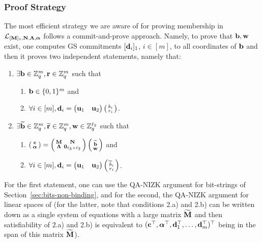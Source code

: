 \subsubsection{Proof Strategy} The most efficient strategy we are aware of for proving membership in $\mathcal{L}_{[\mathbf{{M}}]_1,\mathbf{{N}},\mathbf{{\Lambda}},{\boldsymbol \alpha}}$ follows a 
 commit-and-prove approach. Namely, to prove that $\mathbf{b},\mathbf{w}$ exist, one computes 
GS commitments $[\mathbf{d}_i]_1$, $i \in [m]$, to all coordinates of $\mathbf{b}$ and then it proves two independent statements, namely that:
\vspace{-0.2cm}
\begin{enumerate}
\item $\exists \mathbf{b}\in \mathbb{Z}_q^{m}, \mathbf{r} \in \mathbb{Z}_q^m$ such that  
    \begin{enumerate}
    \item $ \mathbf{b}\in \{0,1\}^{m}$ and 
    \item $\forall i \in [{m}], \mathbf{d}_i=\begin{pmatrix} \mathbf{u}_1 &   \mathbf{u}_2 \end{pmatrix}   \left(\begin{smallmatrix}b_i  \\ r_i\end{smallmatrix}\right)$.
    \end{enumerate}
\item   $\exists \widetilde{\mathbf{b}} \in \mathbb{Z}_q^{m},  \widetilde{\mathbf{r}} \in \mathbb{Z}_q^m, \mathbf{w} \in\mathbb{Z}_q^{\ell_2}$ such that
    \begin{enumerate}
    \item $\left(\begin{smallmatrix}
    \mathbf{c}\\
    {\boldsymbol \alpha}
\end{smallmatrix}\right)
=
\left(\begin{smallmatrix}
    \mathbf{{M}}       & \mathbf{{N}}\\
    \mathbf{{\Lambda}} & \mathbf{{0}}_{{\ell_3}\times {\ell_2}}
\end{smallmatrix}\right)
\left(\begin{smallmatrix}
    \widetilde{\mathbf{b}}\\
    \mathbf{w}
\end{smallmatrix}\right)$ and 
    \item $\forall i \in [m], \mathbf{d}_i=\begin{pmatrix} \mathbf{u}_1 &   \mathbf{u}_2 \end{pmatrix}   \left(\begin{smallmatrix}
\widetilde{b}_i  \\ r_i\end{smallmatrix}\right)$.
    \end{enumerate}
\end{enumerate}
For the first statement, one can use the QA-NIZK argument for bit-strings of Section~\ref{sec:bits-non-binding}, and for the second, the QA-NIZK argument for linear spaces of \cite{C:JutRoy14,EC:KilWee15} (for the latter, note that conditions 2.a) and 2.b) can be written down as a single system of equations with a large matrix $\widetilde{\mathbf{{M}}}$ and then satisfiability of 2.a) and 2.b) is equivalent to  $(\mathbf{c}^{\top},{\boldsymbol \alpha}^{\top},\mathbf{d}_1^{\top}, \ldots, \mathbf{d}_m^{\top})^\top$ being in the span 
of this matrix $\widetilde{\mathbf{{M}}}$).

